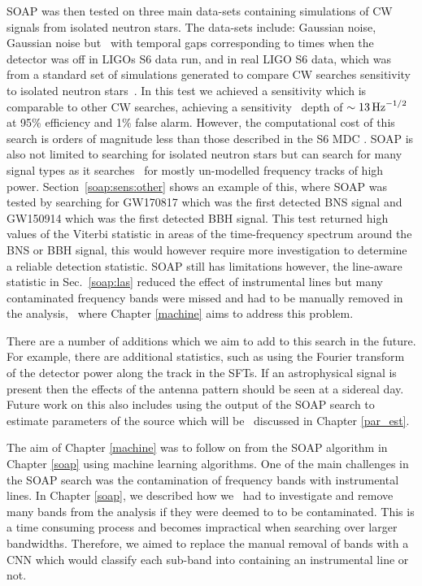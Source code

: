 SOAP was then tested on three main data-sets containing simulations of \gls{CW}
signals from isolated neutron stars.  The data-sets include: Gaussian noise,
Gaussian noise but~ with temporal gaps corresponding to times
when the detector was off in \glspl{LIGO} S6 data run, and in real \gls{LIGO}
S6 data, which was from a standard set of simulations generated to compare
\gls{CW} searches sensitivity to isolated neutron stars~.  In this
test we achieved a sensitivity which is comparable to other \gls{CW} searches,
achieving a sensitivity~ depth of $\sim 13 \,
\rm{Hz}^{-1/2}$ at 95\% efficiency and 1\% false alarm.  However, the
computational cost of this search is orders of magnitude less than those
described in the S6 \gls{MDC} \citep{walsh2016ComparisonMethods}.  SOAP is also
not limited to searching for isolated neutron stars but can search for many
signal types as it searches~ for mostly un-modelled
frequency tracks of high power.  Section~\ref{soap:sens:other} shows an example
of this, where SOAP was tested by searching for GW170817 which was the first
detected \gls{BNS} signal and GW150914 which was the first detected \gls{BBH}
signal.  This test returned high values of the Viterbi statistic in areas of
the time-frequency spectrum around the \gls{BNS} or \gls{BBH} signal, this
would however require more investigation to determine~ a reliable detection statistic.  SOAP still has limitations however,
the line-aware statistic in Sec.~\ref{soap:las} reduced the effect of
instrumental lines but many contaminated frequency bands were missed and had to
be manually removed in the analysis,~ where Chapter \ref{machine} aims to address this problem.

There are a number of additions which we aim to add to this search in the
future.  For example, there are additional statistics, such as using the
Fourier transform of the detector power along the track in the \glspl{SFT}.  If
an astrophysical signal is present then the effects of the antenna pattern
should be seen at a sidereal day.  Future work on this also includes using the
output of the SOAP search to estimate parameters of the source which will
be~ discussed in Chapter \ref{par_est}. 

\bigskip

The aim of Chapter \ref{machine} was to follow on from the SOAP algorithm in
Chapter \ref{soap} using machine learning algorithms.  One of the main
challenges in the SOAP search was the contamination of frequency bands with
instrumental lines.  In Chapter \ref{soap}, we described how we~ had to
investigate and remove many bands from the analysis if they were deemed to to
be contaminated.  This is a time consuming process and becomes impractical when
searching over larger bandwidths.  Therefore, we aimed to replace the manual
removal of bands with a \gls{CNN} which would classify each sub-band into
containing an instrumental line or not.~

